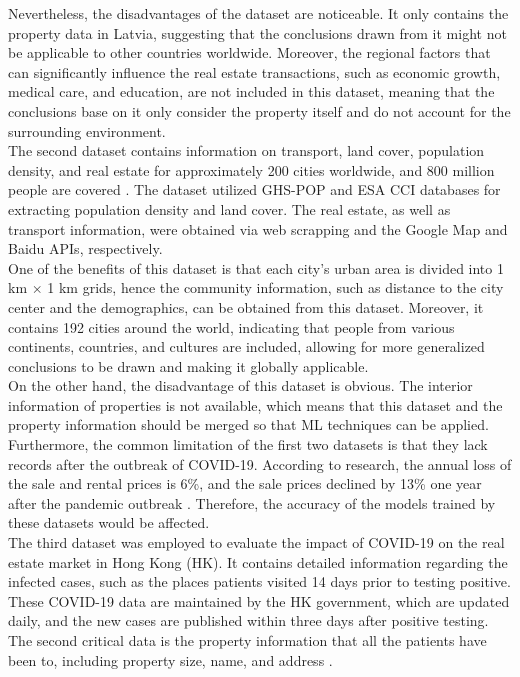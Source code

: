 \documentclass[12pt,twoside]{report}
\begin{document}
Nevertheless, the disadvantages of the dataset are noticeable. It only contains the property data in Latvia, suggesting that the conclusions drawn from it might not be applicable to other countries worldwide. Moreover, the regional factors that can significantly influence the real estate transactions, such as economic growth, medical care, and education, are not included in this dataset, meaning that the conclusions base on it only consider the property itself and do not account for the surrounding environment. 
\\

The second dataset contains information on transport, land cover, population density, and real estate for approximately 200 cities worldwide, and 800 million people are covered \citep{RN26}. The dataset utilized GHS-POP and ESA CCI databases for extracting population density and land cover. The real estate, as well as transport information, were obtained via web scrapping and the Google Map and Baidu APIs, respectively.
\\ 

One of the benefits of this dataset is that each city's urban area is divided into 1 km $\times$ 1 km grids, hence the community information, such as distance to the city center and the demographics, can be obtained from this dataset. Moreover, it contains 192 cities around the world, indicating that people from various continents, countries, and cultures are included, allowing for more generalized conclusions to be drawn and making it globally applicable. 
\\

On the other hand, the disadvantage of this dataset is obvious. The interior information of properties is not available, which means that this dataset and the property information should be merged so that ML techniques can be applied. Furthermore, the common limitation of the first two datasets is that they lack records after the outbreak of COVID-19. According to research, the annual loss of the sale and rental prices is 6\%, and the sale prices declined by 13\% one year after the pandemic outbreak \citep{RN29}. Therefore, the accuracy of the models trained by these datasets would be affected. 
\\

The third dataset was employed to evaluate the impact of COVID-19 on the real estate market in Hong Kong (HK). It contains detailed information regarding the infected cases, such as the places patients visited 14 days prior to testing positive. These COVID-19 data are maintained by the HK government, which are updated daily, and the new cases are published within three days after positive testing. The second critical data is the property information that all the patients have been to, including property size, name, and address \citep{RN24}.
\\ 
\end{document}
